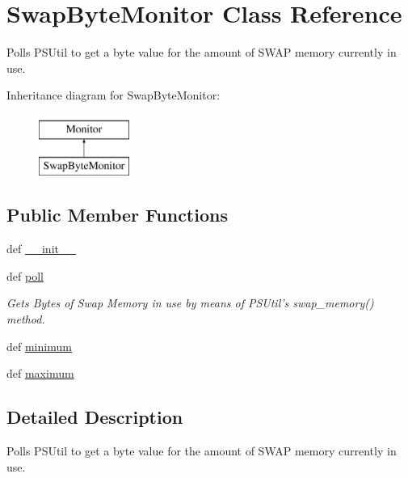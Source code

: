 \hypertarget{classsrc_1_1client_1_1_swap_byte_monitor_1_1_swap_byte_monitor}{\section{Swap\-Byte\-Monitor Class Reference}
\label{classsrc_1_1client_1_1_swap_byte_monitor_1_1_swap_byte_monitor}
}


Polls P\-S\-Util to get a byte value for the amount of S\-W\-A\-P memory currently in use.  


Inheritance diagram for Swap\-Byte\-Monitor\-:\begin{figure}[H]
\begin{center}
\leavevmode
\includegraphics[height=2.000000cm]{classsrc_1_1client_1_1_swap_byte_monitor_1_1_swap_byte_monitor}
\end{center}
\end{figure}
\subsection*{Public Member Functions}
\begin{DoxyCompactItemize}
\item 
def \hyperlink{classsrc_1_1client_1_1_swap_byte_monitor_1_1_swap_byte_monitor_ac775ee34451fdfa742b318538164070e}{\-\_\-\-\_\-init\-\_\-\-\_\-}
\item 
def \hyperlink{classsrc_1_1client_1_1_swap_byte_monitor_1_1_swap_byte_monitor_a87cd0076a6d482a01482f25a64cf2fb4}{poll}
\begin{DoxyCompactList}\small\item\em Gets Bytes of Swap Memory in use by means of P\-S\-Util's swap\-\_\-memory() method. \end{DoxyCompactList}\item 
def \hyperlink{classsrc_1_1client_1_1_swap_byte_monitor_1_1_swap_byte_monitor_a4515aa6e0be4391413959391fef1109f}{minimum}
\item 
def \hyperlink{classsrc_1_1client_1_1_swap_byte_monitor_1_1_swap_byte_monitor_a8f6589fdc9d322ec8e0dc2c7ede55ce9}{maximum}
\end{DoxyCompactItemize}


\subsection{Detailed Description}
Polls P\-S\-Util to get a byte value for the amount of S\-W\-A\-P memory currently in use. 

